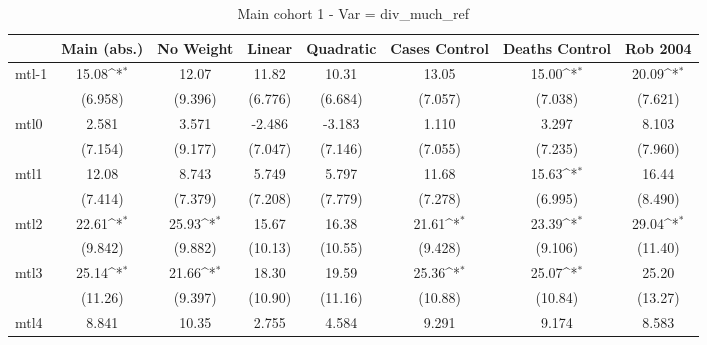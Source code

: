 \documentclass{article}
\begin{document}
{
\def\sym#1{\ifmmode^{#1}\else\(^{#1}\)\fi}
\begin{longtable}{l*{7}{c}}
\caption{Main cohort 1 - Var = div\_much\_ref}\\
\hline\hline\endfirsthead\hline\endhead\hline\endfoot\endlastfoot
                &\multicolumn{1}{c}{Main (abs.)}&\multicolumn{1}{c}{No Weight}&\multicolumn{1}{c}{Linear}&\multicolumn{1}{c}{Quadratic}&\multicolumn{1}{c}{Cases Control}&\multicolumn{1}{c}{Deaths Control}&\multicolumn{1}{c}{Rob 2004}\\
\hline
mtl-1           &    15.08\sym{*}  &    12.07         &    11.82         &    10.31         &    13.05         &    15.00\sym{*}  &    20.09\sym{*}  \\
                &  (6.958)         &  (9.396)         &  (6.776)         &  (6.684)         &  (7.057)         &  (7.038)         &  (7.621)         \\
mtl0            &    2.581         &    3.571         &   -2.486         &   -3.183         &    1.110         &    3.297         &    8.103         \\
                &  (7.154)         &  (9.177)         &  (7.047)         &  (7.146)         &  (7.055)         &  (7.235)         &  (7.960)         \\
mtl1            &    12.08         &    8.743         &    5.749         &    5.797         &    11.68         &    15.63\sym{*}  &    16.44         \\
                &  (7.414)         &  (7.379)         &  (7.208)         &  (7.779)         &  (7.278)         &  (6.995)         &  (8.490)         \\
mtl2            &    22.61\sym{*}  &    25.93\sym{*}  &    15.67         &    16.38         &    21.61\sym{*}  &    23.39\sym{*}  &    29.04\sym{*}  \\
                &  (9.842)         &  (9.882)         &  (10.13)         &  (10.55)         &  (9.428)         &  (9.106)         &  (11.40)         \\
mtl3            &    25.14\sym{*}  &    21.66\sym{*}  &    18.30         &    19.59         &    25.36\sym{*}  &    25.07\sym{*}  &    25.20         \\
                &  (11.26)         &  (9.397)         &  (10.90)         &  (11.16)         &  (10.88)         &  (10.84)         &  (13.27)         \\
mtl4            &    8.841         &    10.35         &    2.755         &    4.584         &    9.291         &    9.174         &    8.583         \\

\end{longtable}}
\end{document}

